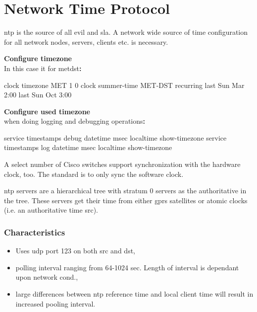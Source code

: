 \chapter[NTP]{Network Time Protocol}

\gls{ntp} is the source of all evil and \gls{sla}. A network wide source of time configuration for all network nodes, servers, clients etc. is necessary.

\textbf{Configure timezone}\\In this case it for \gls{metdst}\textbf{:}

\begin{txt}
clock timezone MET 1 0
clock summer-time MET-DST recurring last Sun Mar 2:00 last Sun Oct 3:00
\end{txt}

\textbf{Configure used timezone}\\when doing logging and debugging operations\textbf{:}

\begin{txt}
service timestamps debug datetime msec localtime show-timezone
service timestamps log datetime msec localtime show-timezone
\end{txt}

A select number of Cisco switches support synchronization with the hardware clock, too. The standard is to only sync the software clock.\\


\gls{ntp} servers are a hierarchical tree with stratum 0 servers as the authoritative in the tree. These servers get their time from either \gls{gprs} satellites or atomic clocks {\footnotesize (i.e. an authoritative time \gls{src})}.

\subsection{Characteristics}

\begin{itemize}
	\item Uses \gls{udp} port 123 on both \gls{src} and \gls{dst},
	\item polling interval ranging from 64-1024 sec. Length of interval is dependant upon network cond.,
	\item large differences between \gls{ntp} reference time and local client time will result in increased pooling interval.
\end{itemize}

